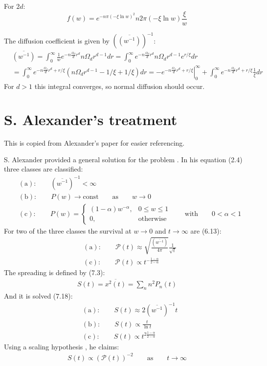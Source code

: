 \documentclass[onecolumn,fleqn]{revtex4}
\begin{document}
For $2d$:
\[ f(w) = e^{-n \pi (-\xi\ln w)^2} n 2\pi  (-\xi\ln w)\frac{\xi}{w}\]

The diffusion coefficient is given by $\left(\overline{(w^{-1})}\right)^{-1}$:
\begin{align*}
    & \overline{(w^{-1})} = \int_0^\infty \frac{1}{w} e^{-n \frac{\Omega_d}{d} r^d} n\Omega_d r^{d-1} dr = \int_0^\infty e^{-n \frac{\Omega_d}{d} r^d} n\Omega_d r^{d-1}e^{r/\xi} dr \\
    & = \int_0^\infty e^{-n \frac{\Omega_d}{d} r^d + r/\xi}(n \Omega_d r^{d-1} - 1/\xi + 1/\xi) dr = - \left. e^{-n \frac{\Omega_d}{d} r^d + r/\xi}\right|_0^\infty + \int_0^\infty e^{-n \frac{\Omega_d}{d} r^d + r/\xi}\frac{1}{\xi} dr 
\end{align*}
For $d>1$ this integral converges, so normal diffusion should occur.
\section{S. Alexander's treatment}
This is copied from Alexander's paper for easier referencing. 


S. Alexander provided a general solution for the problem \cite{Alexander:1981:RMP}. In his equation (2.4) three classes are classified:
\begin{align} 
    &\mathrm{(a) : }\qquad (\overline{w^{-1}})^{-1} < \infty  \\
    &\mathrm{(b) : }\qquad P(w)\rightarrow \mathrm{const} \qquad\mathrm{as}\qquad w \rightarrow 0 \\
    &\mathrm{(c) : }\qquad P(w) = 
        \begin{cases} 
            (1-\alpha)w^{-\alpha} , & 0\le w \le 1 \\
            0, & \mathrm{otherwise}
        \end{cases}
        \qquad\mathrm{with}\qquad 0<\alpha<1
\end{align}
For two of the three classes the survival at $w\rightarrow 0$ and $t\rightarrow \infty$ are (6.13):
\begin{align}
&\mathrm{(a) : }\qquad \mathcal{P}(t) \approx \sqrt{\frac{(\overline{w^{-1}})}{4\pi}}\frac{1}{\sqrt{t}}  \\
&\mathrm{(c) : }\qquad \mathcal{P}(t) \propto t^{-\frac{1-\alpha}{2-\alpha}}
\end{align}
The spreading is defined by (7.3):
\begin{align}\label{eq:spreading}
     S(t) = \overline{x^2(t)} = \sum_n n^2 P_n(t) 
\end{align}
And it is solved (7.18):
\begin{align}
    &\mathrm{(a) : }\qquad S(t) \approx 2(\overline{w^{-1}})^{-1}t  \\
    &\mathrm{(b) : }\qquad S(t) \propto \frac{t}{\ln t}  \\
    &\mathrm{(c) : }\qquad S(t) \propto t^{2\frac{1-\alpha}{2-\alpha}}
\end{align}
Using a scaling hypothesis , he claims:
\begin{align}\label{eq:scaling_hypo}
S(t) \propto \left(\mathcal{P}(t)\right)^{-2} \qquad \mathrm{as}\qquad t\rightarrow \infty
\end{align}
\end{document}

